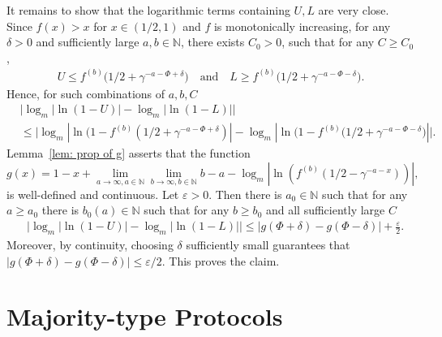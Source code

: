 \documentclass[11pt]{article}
\numberwithin{theorem}{section}
\begin{document}
It remains to show that the logarithmic terms containing $U,L$ are very close. 
Since $f(x)>x$ for $x\in (1/2,1)$ and $f$ is monotonically increasing,
for any $\delta>0$ and sufficiently large $a,b\in\mathbb{N}$, there exists $C_0>0$, such that for any $C\geq C_0$,
\begin{align*}
    U\leq f^{(b)}\big(1/2+\gamma^{-a-\Phi+\delta}\big)
    \quad\text{and}\quad
    L \geq f^{(b)}\big(1/2+\gamma^{-a-\Phi-\delta}\big).
\end{align*}
Hence, for such combinations of $a,b,C$
\begin{align*}
&\Big|\log_m|\ln(1-U)|-\log_m|\ln(1-L)|\Bigr| \\
&\leq \Big|\log_m|\ln (1-f^{(b)}(1/2+\gamma^{-a-\Phi+\delta})|-\log_m|\ln (1-f^{(b)}\big(1/2+\gamma^{-a-\Phi-\delta}\big)| \Big|.
\end{align*}
Lemma~\ref{lem: prop of g} asserts that the function
\[
    g(x)=1-x+\lim_{a\to \infty, a\in\mathbb{N}} \lim_{b \to \infty, b\in \mathbb{N}} b-a- \log_m|\ln( f^{(b)}(1/2-\gamma^{-a-x}))|,
\]
is well-defined and continuous. Let $\varepsilon>0$.  Then there is $a_0\in\mathbb{N}$ such that for any $a\geq a_0$ there is $b_0(a)\in\mathbb{N}$ such that for any $b\geq b_0$ and all sufficiently large $C$
\begin{align}\label{inequ: eps/2}
    &\Big|\log_m|\ln (1-U)|-\log_m|\ln (1-L)| \Big|\leq|g(\Phi+\delta)-g(\Phi-\delta)|+\frac\varepsilon2.
\end{align}
Moreover, by continuity, choosing $\delta$ sufficiently small guarantees that $|g(\Phi+\delta)-g(\Phi-\delta)|\leq \varepsilon/2$. This proves the claim.


\section{Majority-type Protocols}
\label{sec:examples}
\end{document}
